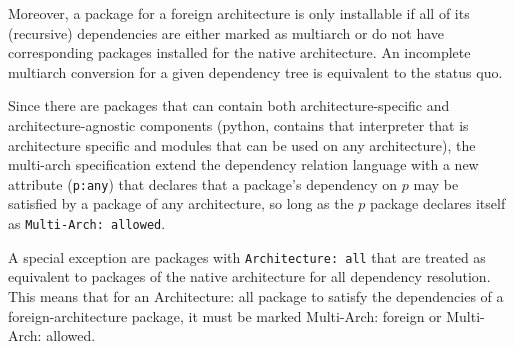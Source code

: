 Moreover, a package for a foreign architecture is only installable if
all of its (recursive) dependencies are either marked as multiarch or
do not have corresponding packages installed for the native
architecture. An incomplete multiarch conversion for a given
dependency tree is equivalent to the status quo. 

Since there are packages that can contain both architecture-specific
and architecture-agnostic components (python, contains that
interpreter that is architecture specific and modules that can be used
on any architecture), the multi-arch specification extend the
dependency relation language with a new attribute (\texttt{p:any})
that declares that a package's dependency on $p$ may be satisfied by a
package of any architecture, so long as the $p$ package declares
itself as \texttt{Multi-Arch: allowed}. 

A special exception are packages with \texttt{Architecture: all} that
are treated as equivalent to packages of the native architecture for
all dependency resolution. This means that for an Architecture: all
package to satisfy the dependencies of a foreign-architecture package,
it must be marked Multi-Arch: foreign or Multi-Arch: allowed. 

